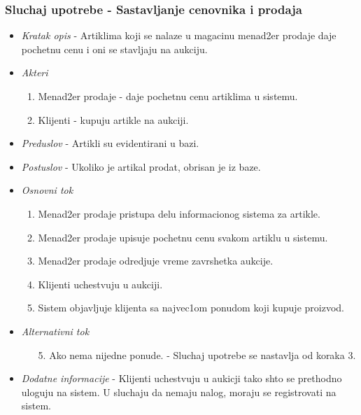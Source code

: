\documentclass[10 pt]{article}
\begin{document}
	\subsubsection{Sluchaj upotrebe - Sastavljanje cenovnika i prodaja}
	
		\begin{itemize}
			\item\textit{Kratak opis} - Artiklima koji se nalaze u magacinu menad2er prodaje daje pochetnu cenu i oni se stavljaju na aukciju. 
			
			\item\textit{Akteri}
				\begin{enumerate}
					\item Menad2er prodaje - daje pochetnu cenu artiklima u sistemu.
					\item Klijenti - kupuju artikle na aukciji.
				\end{enumerate}

			
			\item\textit{Preduslov} - Artikli su evidentirani u bazi. 
			
			\item\textit{Postuslov} - Ukoliko je artikal prodat, obrisan je iz baze.

			
			\item\textit{Osnovni tok}
			\begin{enumerate}
				\item Menad2er prodaje pristupa delu informacionog sistema za artikle.
				\item Menad2er prodaje upisuje pochetnu cenu svakom artiklu u sistemu.

				\item Menad2er prodaje odredjuje vreme zavrshetka aukcije.

				\item Klijenti uchestvuju u aukciji.

				\item Sistem objavljuje klijenta sa najvec1om ponudom koji kupuje proizvod.
			\end{enumerate} 

			
			\item\textit{Alternativni tok}
			\begin{enumerate}
				\item [5.] Ako nema nijedne ponude. - Sluchaj upotrebe se nastavlja od koraka 3.
			\end{enumerate}
			
			\item\textit{Dodatne informacije}
            - Klijenti uchestvuju u aukicji tako shto se prethodno uloguju na sistem. U sluchaju da nemaju nalog, moraju se registrovati na sistem.
			
		\end{itemize}
	
\end{document}
